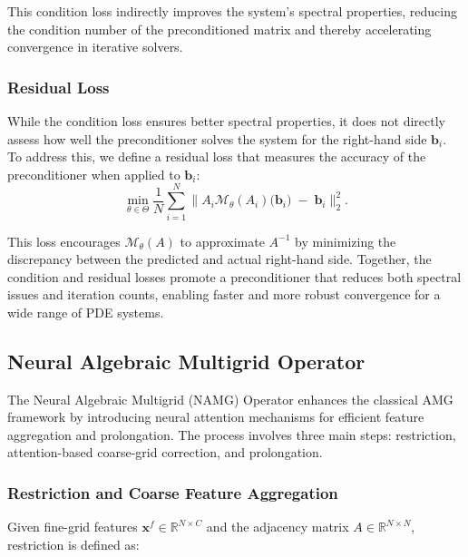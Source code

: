 This condition loss indirectly improves the system's spectral properties, reducing the condition number of the preconditioned matrix and thereby accelerating convergence in iterative solvers.

\subsubsection{Residual Loss}

While the condition loss ensures better spectral properties, it does not directly assess how well the preconditioner solves the system for the right-hand side \(\mathbf{b}_i\). To address this, we define a residual loss that measures the accuracy of the preconditioner when applied to \(\mathbf{b}_i\):
\begin{equation}
    \label{eq:residual_loss}
    \min_{\theta \in \Theta} 
    \frac{1}{N}
    \sum_{i=1}^{N}
    \bigl\|
       A_{i}\mathcal{M}_{\theta}(A_i)\bigl(\mathbf{b}_i\bigr)
       \;-\;
       \mathbf{b}_i
    \bigr\|_2^2.
\end{equation}

This loss encourages \( \mathcal{M}_{\theta}(A) \) to approximate \( A^{-1} \) by minimizing the discrepancy between the predicted and actual right-hand side. Together, the condition and residual losses promote a preconditioner that reduces both spectral issues and iteration counts, enabling faster and more robust convergence for a wide range of PDE systems.

\subsection{Neural Algebraic Multigrid Operator}
\label{subsec:npo_amg}

The Neural Algebraic Multigrid (NAMG) Operator enhances the classical AMG framework by introducing neural attention mechanisms for efficient feature aggregation and prolongation. The process involves three main steps: restriction, attention-based coarse-grid correction, and prolongation.

\subsubsection{Restriction and Coarse Feature Aggregation}

Given fine-grid features \( \mathbf{x}^{f} \in \mathbb{R}^{N \times C} \) and the adjacency matrix \( A \in \mathbb{R}^{N \times N} \), restriction is defined as:

